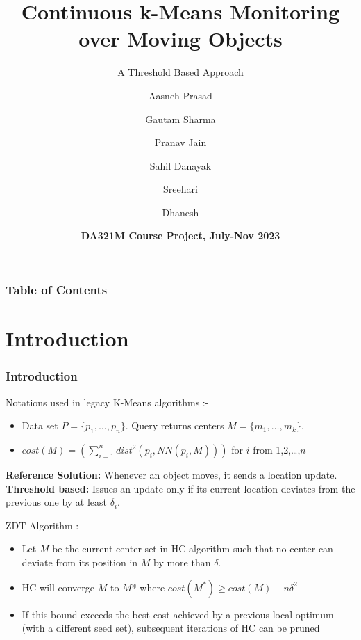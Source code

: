 \documentclass{beamer}
\title[Threshold Based \textit{K}-Means Monitoring] %
{Continuous k-Means Monitoring
over Moving Objects}
\subtitle{A Threshold Based Approach}
\author[Group 7] %
{Aasneh Prasad \and Gautam Sharma \and Pranav Jain \and Sahil Danayak \and Sreehari \and Dhanesh}
\date[16th November 2023] %
{\textbf{DA321M Course Project, July-Nov 2023}}
\begin{document}
\frame{\titlepage}


\begin{frame}
  \frametitle{Table of Contents}
  \tableofcontents
\end{frame}


\section{Introduction}
\begin{frame}
  \frametitle{Introduction}

  \vspace{-1mm}
  Notations used in legacy K-Means algorithms :-
  \begin{itemize}
      \item Data set \(P=\{p_1, \ldots, p_n\}\). Query returns centers \(M=\{m_1, \ldots, m_k\}\).
      \item \(cost(M) = \left( \sum_{i=1}^{n} dist^2(p_i, NN(p_i, M)) \right)\) for \(i\) from 1,2,\ldots,\(n\)
  \end{itemize}
  \vspace{2mm}

    \textbf{Reference Solution:} Whenever an object moves, it sends a location update. \\

    \textbf{Threshold based:} Issues an update only if its current location deviates from the previous one by at least $\delta_i$.

  \vspace{2mm}

  ZDT-Algorithm :-
  \begin{itemize}
      \item Let \(M\) be the current center set in HC algorithm such that no center can deviate from its position in \(M\) by more than \(\delta\).
      \item HC will converge \(M\) to \(M\)* where \(cost(M^*) \geq cost(M)-n\delta^2 \)
      \item If this bound exceeds the best cost achieved by a previous local optimum (with a different seed set), subsequent iterations of HC can be pruned
  \end{itemize}
\end{frame}
\end{document}
